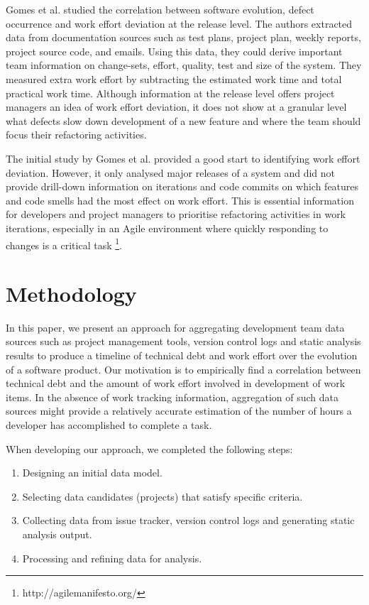 \documentclass{mpaper}
\begin{document}
Gomes et al. \cite{Gomes2011} studied the correlation between software
evolution, defect occurrence and work effort deviation at the release level. The
authors extracted data from documentation sources such as test plans, project
plan, weekly reports, project source code, and emails. Using this data, they
could derive important team information on change-sets, effort, quality, test
and size of the system. They measured extra work effort by subtracting the
estimated work time and total practical work time. Although information at the
release level offers project managers an idea of work effort deviation, it does
not show at a granular level what defects slow down development of a new feature
and where the team should focus their refactoring activities.

The initial study by Gomes et al. \cite{Gomes2011} provided a good start to
identifying work effort deviation. However, it only analysed major releases of a
system and did not provide drill-down information on iterations and code commits
on which features and code smells had the most effect on work effort. This is
essential information for developers and project managers to prioritise
refactoring activities in work iterations, especially in an Agile environment
where quickly responding to changes is a critical task
\footnote{http://agilemanifesto.org/}.

\section{Methodology}
\label{methodology}

In this paper, we present an approach for aggregating development team data
sources such as project management tools, version control logs and static
analysis results to produce a timeline of technical debt and work effort over
the evolution of a software product. Our motivation is to empirically find a
correlation between technical debt and the amount of work effort involved in
development of work items. In the absence of work tracking information,
aggregation of such data sources might provide a relatively accurate estimation
of the number of hours a developer has accomplished to complete a task.

When developing our approach, we completed the following steps:
\begin{enumerate}
  \item Designing an initial data model.
  \item Selecting data candidates (projects) that satisfy specific criteria.
  \item Collecting data from issue tracker, version control logs and generating
  static analysis output.
  \item Processing and refining data for analysis. 
\end{enumerate}
\end{document}
